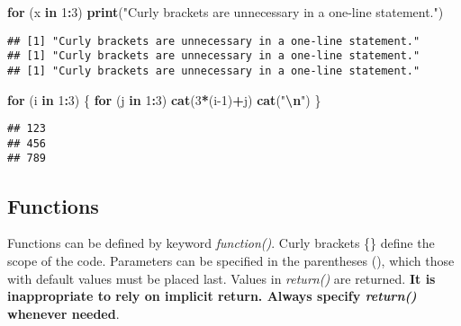 \documentclass[
  12pt,
]{article}
\newenvironment{Shaded}{\begin{snugshade}}{\end{snugshade}}
\newcommand{\ControlFlowTok}[1]{\textcolor[rgb]{0.13,0.29,0.53}{\textbf{#1}}}
\newcommand{\DecValTok}[1]{\textcolor[rgb]{0.00,0.00,0.81}{#1}}
\newcommand{\FunctionTok}[1]{\textcolor[rgb]{0.13,0.29,0.53}{\textbf{#1}}}
\newcommand{\NormalTok}[1]{#1}
\newcommand{\SpecialCharTok}[1]{\textcolor[rgb]{0.81,0.36,0.00}{\textbf{#1}}}
\newcommand{\StringTok}[1]{\textcolor[rgb]{0.31,0.60,0.02}{#1}}
\begin{document}
\begin{Shaded}
\begin{Highlighting}[]
\ControlFlowTok{for}\NormalTok{ (x }\ControlFlowTok{in} \DecValTok{1}\SpecialCharTok{:}\DecValTok{3}\NormalTok{)}
  \FunctionTok{print}\NormalTok{(}\StringTok{"Curly brackets are unnecessary in a one{-}line statement."}\NormalTok{)}
\end{Highlighting}
\end{Shaded}

\begin{verbatim}
## [1] "Curly brackets are unnecessary in a one-line statement."
## [1] "Curly brackets are unnecessary in a one-line statement."
## [1] "Curly brackets are unnecessary in a one-line statement."
\end{verbatim}

\begin{Shaded}
\begin{Highlighting}[]
\ControlFlowTok{for}\NormalTok{ (i }\ControlFlowTok{in} \DecValTok{1}\SpecialCharTok{:}\DecValTok{3}\NormalTok{) \{}
  \ControlFlowTok{for}\NormalTok{ (j }\ControlFlowTok{in} \DecValTok{1}\SpecialCharTok{:}\DecValTok{3}\NormalTok{)}
    \FunctionTok{cat}\NormalTok{(}\DecValTok{3}\SpecialCharTok{*}\NormalTok{(i}\DecValTok{{-}1}\NormalTok{)}\SpecialCharTok{+}\NormalTok{j)}
  \FunctionTok{cat}\NormalTok{(}\StringTok{"}\SpecialCharTok{\textbackslash{}n}\StringTok{"}\NormalTok{)}
\NormalTok{\}}
\end{Highlighting}
\end{Shaded}

\begin{verbatim}
## 123
## 456
## 789
\end{verbatim}

\subsection{Functions}
\label{sec:BRS-function}

Functions can be defined by keyword \textit{function()}. Curly brackets
\{\} define the scope of the code. Parameters can be specified in the
parentheses (), which those with default values must be placed last.
Values in \textit{return()} are returned.
\textbf{It is inappropriate to rely on implicit return. Always specify \textit{return()} whenever needed}.
\end{document}
